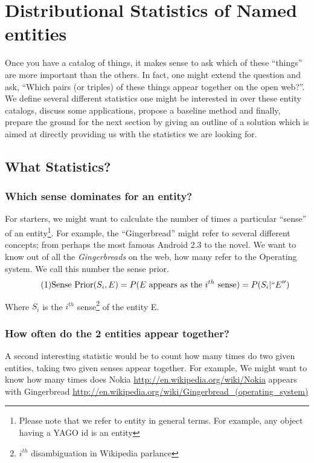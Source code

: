 \section{Distributional Statistics of Named entities}
Once you have a catalog of things, it makes sense to ask which of these ``things'' are more important than the others.
In fact, one might extend the question and ask, ``Which pairs (or triples) of these things appear together on the open web?''.
We define several different statistics one might be interested in over these entity catalogs, discuss some applications, 
propose a baseline method and finally, prepare the ground for the next section by giving an outline of a solution 
which is aimed at directly providing us with the statistics we are looking for. 

\subsection{What Statistics?}

\subsubsection{Which sense dominates for an entity?}
For starters, we might want to calculate the number of times a particular ``sense'' of an entity\footnote{Please note that we 
refer to entity in general terms. For example, any object having a YAGO id is an entity}. 
For example, the ``Gingerbread'' might refer to several different concepts; from perhaps the most famous Android 2.3 to the novel.
We want to know out of all the \emph{Gingerbreads} on the web, how many refer to the Operating system. 
We call this number the sense prior.
\begin{equation}
\tag{1}
\text{Sense Prior}(S_i, E) =  P(E\text{ appears as the $i^{th}$ sense}) = P(S_i | ``E'')
\end{equation}

Where $S_i$ is the $i^{th}$ sense\footnote{$i^{th}$ disambiguation in Wikipedia parlance} of the entity E. 

\subsubsection{How often do the 2 entities appear together?}
A second interesting statistic would be to count how many times do two given entities, taking two given senses appear together.
For example, We might want to know how many times does Nokia \url{http://en.wikipedia.org/wiki/Nokia} appears with Gingerbread \url{http://en.wikipedia.org/wiki/Gingerbread_(operating_system)}

